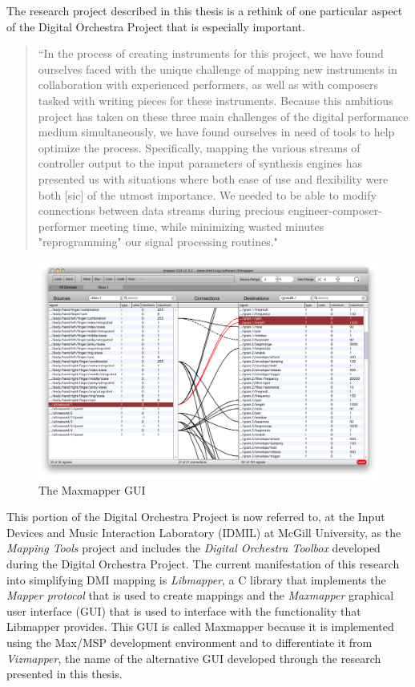The research project described in this thesis is a rethink of one particular aspect of the Digital Orchestra Project that is especially important.

\begin{quote}
``In the process of creating instruments for this project, we have found ourselves faced with the unique challenge of mapping new instruments in collaboration with experienced performers, as well as with composers tasked with writing pieces for these instruments. Because this ambitious project has taken on these three main challenges of the digital performance medium simultaneously, we have found ourselves in need of tools to help optimize the process. Specifically, mapping the various streams of controller output to the input parameters of synthesis engines has presented us with situations where both ease of use and flexibility were both [sic] of the utmost importance. We needed to be able to modify connections between data streams during precious engineer-composer-performer meeting time, while minimizing wasted minutes "reprogramming" our signal processing routines." \cite{Malloch2007}
\end{quote}

\begin{figure}[htb]
\centering
\includegraphics[width=1.0\textwidth]{maxmapper.png}
\caption{The Maxmapper GUI}
\label{fig:maxmapper}
\end{figure}

This portion of the Digital Orchestra Project is now referred to, at the Input Devices and Music Interaction Laboratory (IDMIL) at McGill University, as the \emph{Mapping Tools} project and includes the \emph{Digital Orchestra Toolbox} developed during the Digital Orchestra Project. The current manifestation of this research into simplifying DMI mapping is \emph{Libmapper}, a C library that implements the \emph{Mapper protocol} that is used to create mappings and the \emph{Maxmapper} graphical user interface (GUI) that is used to interface with the functionality that Libmapper provides. This GUI is called Maxmapper because it is implemented using the Max/MSP development environment and to differentiate it from \emph{Vizmapper}, the name of the alternative GUI developed through the research presented in this thesis.

